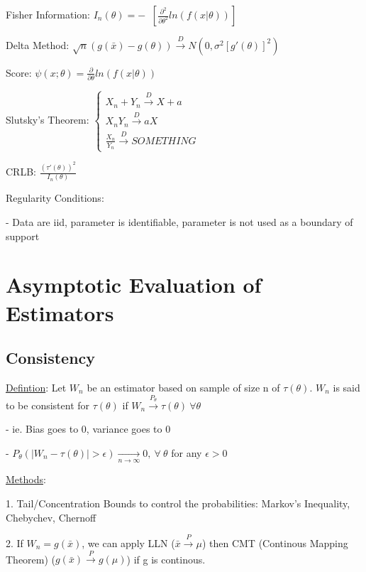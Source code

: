 \documentclass{article}
\DeclareMathOperator{\EX}{\mathbb{E}} %
\DeclareMathOperator{\ext}{\EX_{\theta}} %
\newcommand{\pto}{\overset{P}{\to}}
\newcommand{\dto}{\overset{D}{\to}}
\begin{document}
Fisher Information: $I_n(\theta) = -\ext[\frac{\partial^2}{\partial \theta^2} ln(f(x|\theta))]$ 

Delta Method: $\sqrt{n}(g(\bar{x}) - g(\theta)) \dto N(0, \sigma^2[g'(\theta)]^2)$

Score: $\psi(x;\theta) = \frac{\partial}{\partial \theta} ln(f(x|\theta))$

Slutsky's Theorem: $\begin{cases} X_n + Y_n \dto X + a \\ X_nY_n \dto aX \\ \frac{X_n}{Y_n} \dto SOMETHING \end{cases}$

CRLB: $\frac{(\tau'(\theta))^2}{I_n(\theta)}$

Regularity Conditions: 

- Data are iid, parameter is identifiable, parameter is not used as a boundary of support


\section{}

\section{Asymptotic Evaluation of Estimators}

\subsection{Consistency}

\underline{Defintion}: Let $W_n$ be an estimator based on sample of size n of $\tau(\theta)$. $W_n$ is said to be consistent for $\tau(\theta)$ if $W_n \overset{P_{\theta}}{\to} \tau(\theta) \ \forall \theta$

- ie. Bias goes to 0, variance goes to 0

- $P_{\theta}(|W_n - \tau(\theta)| > \epsilon) \underset{n \to \infty}{\to} 0, \ \forall \ \theta$ for any $\epsilon > 0$

\underline{Methods}:

1. Tail/Concentration Bounds to control the probabilities: Markov's Inequality, Chebychev, Chernoff

2. If $W_n = g(\bar{x})$, we can apply LLN ($\bar{x} \pto \mu$) then CMT (Continous Mapping Theorem) ($g(\bar{x}) \pto g(\mu)$) if g is continous.
\end{document}
